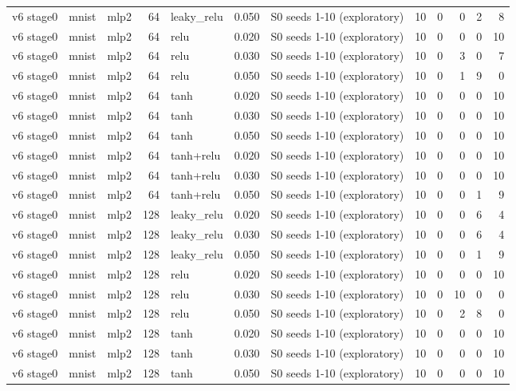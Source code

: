 \begin{table}[htbp]
{\begin{tabular}{@{}lllrlrlrrrrr@{}}
v6 stage0 & mnist & mlp2 & 64 & leaky\_relu & 0.050 & S0 seeds 1-10 (exploratory) & 10 & 0 & 0 & 2 & 8 \\
v6 stage0 & mnist & mlp2 & 64 & relu & 0.020 & S0 seeds 1-10 (exploratory) & 10 & 0 & 0 & 0 & 10 \\
v6 stage0 & mnist & mlp2 & 64 & relu & 0.030 & S0 seeds 1-10 (exploratory) & 10 & 0 & 3 & 0 & 7 \\
v6 stage0 & mnist & mlp2 & 64 & relu & 0.050 & S0 seeds 1-10 (exploratory) & 10 & 0 & 1 & 9 & 0 \\
v6 stage0 & mnist & mlp2 & 64 & tanh & 0.020 & S0 seeds 1-10 (exploratory) & 10 & 0 & 0 & 0 & 10 \\
v6 stage0 & mnist & mlp2 & 64 & tanh & 0.030 & S0 seeds 1-10 (exploratory) & 10 & 0 & 0 & 0 & 10 \\
v6 stage0 & mnist & mlp2 & 64 & tanh & 0.050 & S0 seeds 1-10 (exploratory) & 10 & 0 & 0 & 0 & 10 \\
v6 stage0 & mnist & mlp2 & 64 & tanh+relu & 0.020 & S0 seeds 1-10 (exploratory) & 10 & 0 & 0 & 0 & 10 \\
v6 stage0 & mnist & mlp2 & 64 & tanh+relu & 0.030 & S0 seeds 1-10 (exploratory) & 10 & 0 & 0 & 0 & 10 \\
v6 stage0 & mnist & mlp2 & 64 & tanh+relu & 0.050 & S0 seeds 1-10 (exploratory) & 10 & 0 & 0 & 1 & 9 \\
v6 stage0 & mnist & mlp2 & 128 & leaky\_relu & 0.020 & S0 seeds 1-10 (exploratory) & 10 & 0 & 0 & 6 & 4 \\
v6 stage0 & mnist & mlp2 & 128 & leaky\_relu & 0.030 & S0 seeds 1-10 (exploratory) & 10 & 0 & 0 & 6 & 4 \\
v6 stage0 & mnist & mlp2 & 128 & leaky\_relu & 0.050 & S0 seeds 1-10 (exploratory) & 10 & 0 & 0 & 1 & 9 \\
v6 stage0 & mnist & mlp2 & 128 & relu & 0.020 & S0 seeds 1-10 (exploratory) & 10 & 0 & 0 & 0 & 10 \\
v6 stage0 & mnist & mlp2 & 128 & relu & 0.030 & S0 seeds 1-10 (exploratory) & 10 & 0 & 10 & 0 & 0 \\
v6 stage0 & mnist & mlp2 & 128 & relu & 0.050 & S0 seeds 1-10 (exploratory) & 10 & 0 & 2 & 8 & 0 \\
v6 stage0 & mnist & mlp2 & 128 & tanh & 0.020 & S0 seeds 1-10 (exploratory) & 10 & 0 & 0 & 0 & 10 \\
v6 stage0 & mnist & mlp2 & 128 & tanh & 0.030 & S0 seeds 1-10 (exploratory) & 10 & 0 & 0 & 0 & 10 \\
v6 stage0 & mnist & mlp2 & 128 & tanh & 0.050 & S0 seeds 1-10 (exploratory) & 10 & 0 & 0 & 0 & 10 \\

\end{tabular}}
\end{table}
